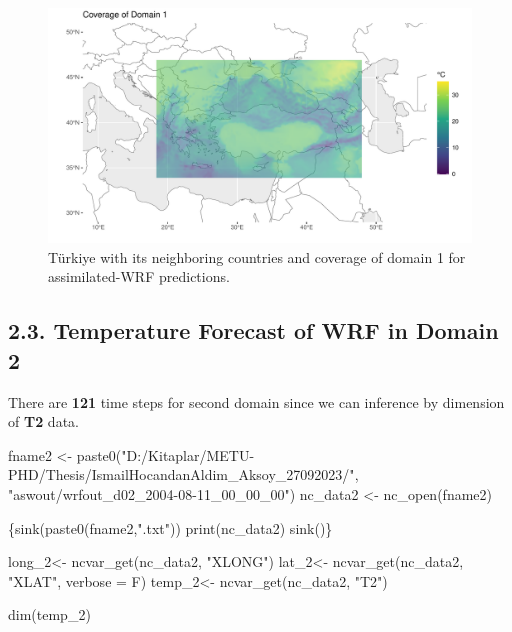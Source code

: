 \documentclass[
  letterpaper,
  DIV=11,
  numbers=noendperiod,
  abstract]{scrartcl}
\newenvironment{Shaded}{\begin{snugshade}}{\end{snugshade}}
\newcommand{\AttributeTok}[1]{\textcolor[rgb]{0.40,0.45,0.13}{#1}}
\newcommand{\FunctionTok}[1]{\textcolor[rgb]{0.28,0.35,0.67}{#1}}
\newcommand{\NormalTok}[1]{\textcolor[rgb]{0.00,0.23,0.31}{#1}}
\newcommand{\OtherTok}[1]{\textcolor[rgb]{0.00,0.23,0.31}{#1}}
\newcommand{\StringTok}[1]{\textcolor[rgb]{0.13,0.47,0.30}{#1}}
\begin{document}
\begin{figure}[H]

{\centering \includegraphics{WRF_pdf_files/figure-pdf/fig-domain1-1.pdf}

}

\caption{\label{fig-domain1}Türkiye with its neighboring countries and
coverage of domain 1 for assimilated-WRF predictions.}

\end{figure}

\hypertarget{temperature-forecast-of-wrf-in-domain-2}{%
\subsection{2.3. Temperature Forecast of WRF in Domain
2}\label{temperature-forecast-of-wrf-in-domain-2}}

There are \textbf{121} time steps for second domain since we can
inference by dimension of \textbf{T2} data.

\begin{Shaded}
\begin{Highlighting}[]
\NormalTok{fname2 }\OtherTok{\textless{}{-}} \FunctionTok{paste0}\NormalTok{(}\StringTok{"D:/Kitaplar/METU{-}PHD/Thesis/IsmailHocandanAldim\_Aksoy\_27092023/"}\NormalTok{,}
\StringTok{"aswout/wrfout\_d02\_2004{-}08{-}11\_00\_00\_00"}\NormalTok{)}
\NormalTok{nc\_data2 }\OtherTok{\textless{}{-}} \FunctionTok{nc\_open}\NormalTok{(fname2)}

\NormalTok{\{}\FunctionTok{sink}\NormalTok{(}\FunctionTok{paste0}\NormalTok{(fname2,}\StringTok{".txt"}\NormalTok{))}
  \FunctionTok{print}\NormalTok{(nc\_data2)}
  \FunctionTok{sink}\NormalTok{()\}}

\NormalTok{long\_2}\OtherTok{\textless{}{-}} \FunctionTok{ncvar\_get}\NormalTok{(nc\_data2, }\StringTok{"XLONG"}\NormalTok{)}
\NormalTok{lat\_2}\OtherTok{\textless{}{-}} \FunctionTok{ncvar\_get}\NormalTok{(nc\_data2, }\StringTok{"XLAT"}\NormalTok{, }\AttributeTok{verbose =}\NormalTok{ F)}
\NormalTok{temp\_2}\OtherTok{\textless{}{-}} \FunctionTok{ncvar\_get}\NormalTok{(nc\_data2, }\StringTok{"T2"}\NormalTok{) }

\FunctionTok{dim}\NormalTok{(temp\_2)}
\end{Highlighting}
\end{Shaded}
\end{document}

